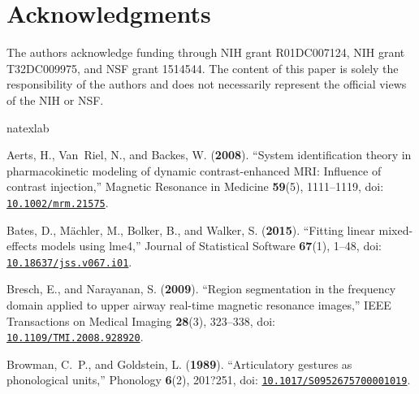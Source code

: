 \documentclass[preprint]{JASAnew}\usepackage[]{graphicx}\usepackage[]{color}
\begin{document}
\section{Acknowledgments} 

The authors acknowledge funding through NIH grant R01DC007124, NIH grant T32DC009975, and NSF grant 1514544. The content of this paper is solely the responsibility of the authors and does not necessarily represent the official views of the NIH or NSF.

%

\begin{thebibliography}{29}
\def\enquote#1{``#1,''}
\def\plainquote#1{``#1''}
\expandafter\ifx\csname natexlab\endcsname\relax\def\natexlab#1{#1}\fi
\providecommand{\dourl}[1]{\href{http://#1}{\nolinkurl{#1}}}
\providecommand{\bibinfo}[2]{#2}
\providecommand{\noopsort}[1]{}
\providecommand{\switchargs}[2]{#2#1}
  \def\eatspace #1{#1}
\providecommand{\dodoi}[1]{doi: \href{http://dx.doi.org/#1}{\nolinkurl{#1}}}

\bibinfo{author}{Aerts, H.}, \bibinfo{author}{Van~Riel, N.},  and
  \bibinfo{author}{Backes, W.} (\textbf{\bibinfo{year}{2008}}).
  \enquote{\bibinfo{title}{System identification theory in pharmacokinetic
  modeling of dynamic contrast-enhanced {MRI}: Influence of contrast
  injection}} \bibinfo{journal}{Magnetic Resonance in Medicine} \textbf{59}(5),
  \bibinfo{pages}{1111--1119}, \dodoi{10.1002/mrm.21575}.

\bibinfo{author}{Bates, D.}, \bibinfo{author}{M{\"a}chler, M.},
  \bibinfo{author}{Bolker, B.},  and \bibinfo{author}{Walker, S.}
  (\textbf{\bibinfo{year}{2015}}). \enquote{\bibinfo{title}{Fitting linear
  mixed-effects models using {lme4}}} \bibinfo{journal}{Journal of Statistical
  Software} \textbf{67}(1), \bibinfo{pages}{1--48},
  \dodoi{10.18637/jss.v067.i01}.

\bibinfo{author}{Bresch, E.},  and \bibinfo{author}{Narayanan, S.}
  (\textbf{\bibinfo{year}{2009}}). \enquote{\bibinfo{title}{Region segmentation
  in the frequency domain applied to upper airway real-time magnetic resonance
  images}} \bibinfo{journal}{IEEE Transactions on Medical Imaging}
  \textbf{28}(3), \bibinfo{pages}{323--338}, \dodoi{10.1109/TMI.2008.928920}.

\bibinfo{author}{Browman, C.~P.},  and \bibinfo{author}{Goldstein, L.}
  (\textbf{\bibinfo{year}{1989}}). \enquote{\bibinfo{title}{Articulatory
  gestures as phonological units}} \bibinfo{journal}{Phonology} \textbf{6}(2),
  \bibinfo{pages}{201?251}, \dodoi{10.1017/S0952675700001019}.


\end{thebibliography}
\end{document}
